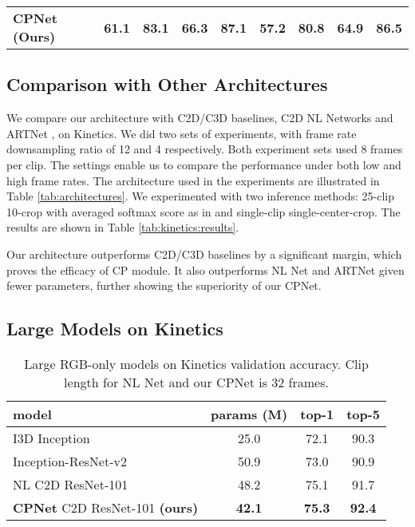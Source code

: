 \documentclass[10pt,twocolumn,letterpaper]{article}
\begin{document}
\begin{table*}[h]
{\begin{tabular}{l|p{1cm}p{1cm}|p{1cm}p{1cm}|p{1cm}p{1cm}|p{1cm}p{1cm}}
\textbf{CPNet (Ours)} & \multicolumn{1}{c}{\textbf{61.1}} & \multicolumn{1}{c|}{\textbf{83.1}} & \multicolumn{1}{c}{\textbf{66.3}} & \multicolumn{1}{c|}{\textbf{87.1}} & \multicolumn{1}{c}{\textbf{57.2}} & \multicolumn{1}{c|}{\textbf{80.8}} & \multicolumn{1}{c}{\textbf{64.9}} & \multicolumn{1}{c}{\textbf{86.5}} \\ 
\end{tabular} \label{tab:kinetics:comparison}
}\vspace{-4ex}
\end{table*}


\subsection{Comparison with Other Architectures}

We compare our architecture with C2D/C3D baselines, C2D NL Networks \cite{NLNet} and ARTNet \cite{ARTNet}, on Kinetics.
We did two sets of experiments, with frame rate downsampling ratio of 12 and 4 respectively. Both experiment sets used 8 frames per clip. The settings enable us to compare the performance under both low and high frame rates.  The architecture used in the experiments
are illustrated in Table \ref{tab:architectures}. 
We experimented with two inference methods: 25-clip 10-crop with averaged softmax score as in \cite{ARTNet} and single-clip single-center-crop. The results are shown in Table \ref{tab:kinetics:results}. 

Our architecture outperforms C2D/C3D baselines by a significant margin, which proves the efficacy of CP module. It also outperforms NL Net and ARTNet given fewer parameters, further showing the superiority of our CPNet.



\subsection{Large Models on Kinetics}
\label{sec:large:kinetics}

\begin{table}[t]
\small
\setlength{\tabcolsep}{5pt}
\centering
\caption{Large RGB-only models on Kinetics validation accuracy. Clip length for NL Net and our CPNet is 32 frames.}
\vspace{-1.5ex}
\label{tab:kinetics:sota}
\begin{tabular}{l|c|c|c}
model & params (M)  & top-1 & top-5\\ \hline
I3D Inception \cite{I3D} & 25.0 & 72.1 & 90.3 \\
Inception-ResNet-v2 \cite{Activity:Kinetics:challenge:2017} & 50.9 & 73.0 & 90.9 \\ 
NL C2D ResNet-101 \cite{NLNet} & 48.2 & 75.1 & 91.7 \\ \hline
\textbf{CPNet} C2D ResNet-101 \textbf{(ours)} & \textbf{42.1} & \textbf{75.3} & \textbf{92.4}
\end{tabular}
\vspace{-1ex}
\end{table}
\end{document}
